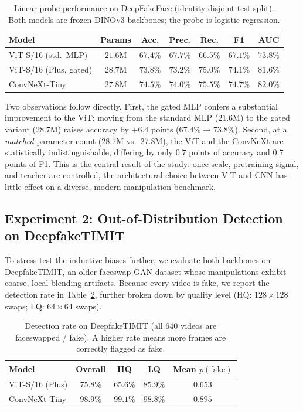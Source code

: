 \documentclass[11pt,a4paper]{article}
\begin{document}
\begin{table}[H]
\centering
\caption{Linear-probe performance on DeepFakeFace (identity-disjoint test split). Both models
are frozen \textsc{DINOv3} backbones; the probe is logistic regression.}
\label{tab:deepfakeface}
\begin{tabular}{lcccccc}
\toprule
\textbf{Model} & \textbf{Params} & \textbf{Acc.} & \textbf{Prec.} & \textbf{Rec.} & \textbf{F1} & \textbf{AUC} \\
\midrule
ViT-S/16 (std.\ MLP)      & $21.6$M & $67.4\%$ & $67.7\%$ & $66.5\%$ & $67.1\%$ & $73.8\%$ \\
ViT-S/16 (Plus, gated)    & $28.7$M & $73.8\%$ & $73.2\%$ & $75.0\%$ & $74.1\%$ & $81.6\%$ \\
ConvNeXt-Tiny             & $27.8$M & $74.5\%$ & $74.0\%$ & $75.5\%$ & $74.7\%$ & $82.0\%$ \\
\bottomrule
\end{tabular}
\end{table}

Two observations follow directly. First, the gated MLP confers a substantial improvement to the
ViT: moving from the standard MLP ($21.6$M) to the gated variant ($28.7$M) raises accuracy by
$+6.4$ points ($67.4\% \to 73.8\%$). Second, at a \emph{matched} parameter count ($28.7$M vs.\
$27.8$M), the ViT and the ConvNeXt are statistically indistinguishable, differing by only $0.7$
points of accuracy and $0.7$ points of F1. This is the central result of the study: once scale,
pretraining signal, and teacher are controlled, the architectural choice between ViT and CNN has
little effect on a diverse, modern manipulation benchmark.

\subsection{Experiment 2: Out-of-Distribution Detection on DeepfakeTIMIT}
To stress-test the inductive biases further, we evaluate both backbones on DeepfakeTIMIT, an older
faceswap-GAN dataset whose manipulations exhibit coarse, local blending artifacts. Because every
video is fake, we report the detection rate in Table~\ref{tab:df_timit}, further broken down by
quality level (HQ: $128\times128$ swaps; LQ: $64\times64$ swaps).

\begin{table}[H]
\centering
\caption{Detection rate on DeepfakeTIMIT (all $640$ videos are faceswapped / fake). A higher
rate means more frames are correctly flagged as fake.}
\label{tab:df_timit}
\begin{tabular}{lcccc}
\toprule
\textbf{Model} & \textbf{Overall} & \textbf{HQ} & \textbf{LQ} & \textbf{Mean $p(\text{fake})$} \\
\midrule
ViT-S/16 (Plus)   & $75.8\%$ & $65.6\%$ & $85.9\%$ & $0.653$ \\
ConvNeXt-Tiny     & $98.9\%$ & $99.1\%$ & $98.8\%$ & $0.895$ \\
\bottomrule
\end{tabular}
\end{table}
\end{document}
